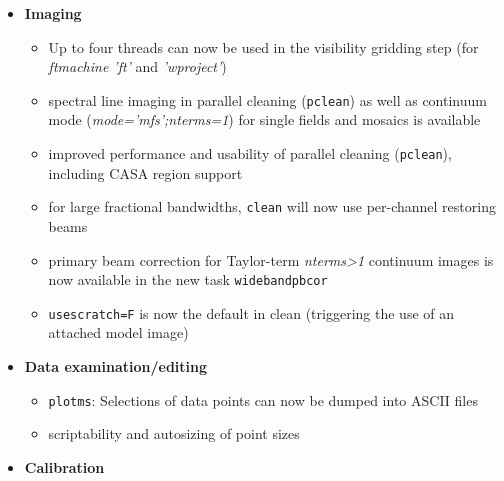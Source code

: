 \begin{itemize}
\item  {\bf Imaging}
  \begin{itemize}
    \item  Up to four threads can now be used in the visibility
      gridding step (for {\it ftmachine 'ft'} and {\it 'wproject'})
    \item  spectral line imaging in parallel cleaning ({\tt pclean}) as well as continuum mode ({\it  mode='mfs';nterms=1}) for single fields and mosaics is available
    \item  improved performance and usability of parallel cleaning ({\tt pclean}), including CASA region support
    \item  for large fractional bandwidths, {\tt clean} will now use per-channel restoring beams 
    \item  primary beam correction for Taylor-term {\it nterms>1} continuum images is now available in the new task {\tt widebandpbcor}
    \item  {\tt usescratch=F} is now the default in clean (triggering the use of an attached model image) 

\end{itemize}


\item  {\bf Data examination/editing}
   \begin{itemize}

     \item  {\tt plotms}: Selections of data points can now be dumped into ASCII files
     \item  scriptability and autosizing of point sizes     

\end{itemize}

\item  {\bf Calibration}

\begin{itemize}


\end{itemize}
\end{itemize}
